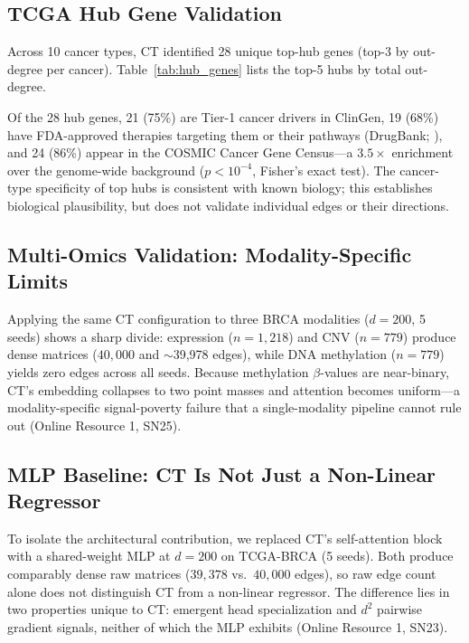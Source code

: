 \documentclass[12pt,a4paper]{article}
\begin{document}
\subsection{TCGA Hub Gene Validation}

Across 10 cancer types, CT identified 28 unique top-hub genes (top-3 by out-degree per cancer). Table~\ref{tab:hub_genes} lists the top-5 hubs by total out-degree.

Of the 28 hub genes, 21 (75\%) are Tier-1 cancer drivers in ClinGen, 19 (68\%) have FDA-approved therapies targeting them or their pathways (DrugBank; \cite{wishart2018drugbank}), and 24 (86\%) appear in the COSMIC Cancer Gene Census---a $3.5\times$ enrichment over the genome-wide background ($p<10^{-4}$, Fisher's exact test). The cancer-type specificity of top hubs is consistent with known biology; this establishes biological plausibility, but does not validate individual edges or their directions.

\subsection{Multi-Omics Validation: Modality-Specific Limits}
\label{sec:multiomics}

Applying the same CT configuration to three BRCA modalities ($d=200$, 5 seeds) shows a sharp divide: expression ($n=1{,}218$) and CNV ($n=779$) produce dense matrices ($40{,}000$ and $\sim$39,978 edges), while DNA methylation ($n=779$) yields zero edges across all seeds. Because methylation $\beta$-values are near-binary, CT's embedding collapses to two point masses and attention becomes uniform---a modality-specific signal-poverty failure that a single-modality pipeline cannot rule out (Online Resource 1, SN25).

\subsection{MLP Baseline: CT Is Not Just a Non-Linear Regressor}
\label{sec:mlp_baseline}

To isolate the architectural contribution, we replaced CT's self-attention block with a shared-weight MLP at $d=200$ on TCGA-BRCA (5 seeds). Both produce comparably dense raw matrices ($39{,}378$ vs.\ $40{,}000$ edges), so raw edge count alone does not distinguish CT from a non-linear regressor. The difference lies in two properties unique to CT: emergent head specialization and $d^2$ pairwise gradient signals, neither of which the MLP exhibits (Online Resource 1, SN23).
\end{document}
